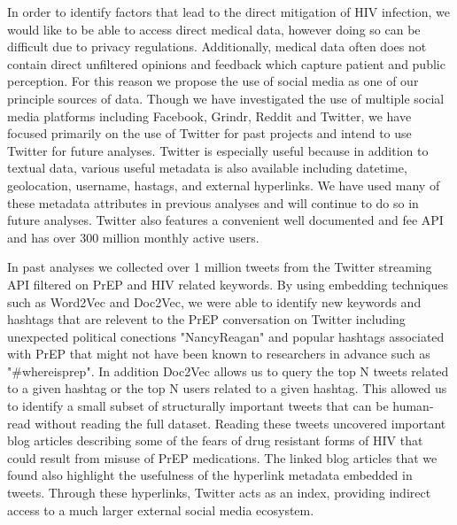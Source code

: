 In order to identify factors that lead to the direct mitigation of HIV infection, we would like to be able to access direct medical data, however doing so can be difficult due to privacy regulations. Additionally, medical data often does not contain direct unfiltered opinions and feedback which capture patient and public perception. For this reason we propose the use of social media as one of our principle sources of data. Though we have investigated the use of multiple social media platforms including Facebook, Grindr, Reddit and Twitter, we have focused primarily on the use of Twitter for past projects and intend to use Twitter for future analyses. Twitter is especially useful because in addition to textual data, various useful metadata is also available including datetime, geolocation, username, hastags, and external hyperlinks. We have used many of these metadata attributes in previous analyses and will continue to do so in future analyses. Twitter also features a convenient well documented and fee API and has over 300 million monthly active users.

In past analyses we collected over 1 million tweets from the Twitter streaming API filtered on PrEP and HIV related keywords. By using embedding techniques such as Word2Vec and Doc2Vec, we were able to identify new keywords and hashtags that are relevent to the PrEP conversation on Twitter including unexpected political conections "NancyReagan" and popular hashtags associated with PrEP that might not have been known to researchers in advance such as "\#whereisprep". In addition Doc2Vec allows us to query the top N tweets related to a given hashtag or the top N users related to a given hashtag. This allowed us to identify a small subset of structurally important tweets that can be human-read without reading the full dataset. Reading these tweets uncovered important blog articles describing some of the fears of drug resistant forms of HIV that could result from misuse of PrEP medications. The linked blog articles that we found also highlight the usefulness of the hyperlink metadata embedded in tweets. Through these hyperlinks, Twitter acts as an index, providing indirect access to a much larger external social media ecosystem.

